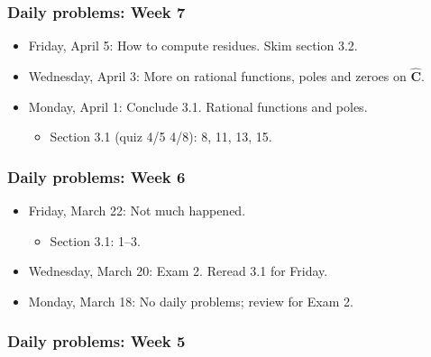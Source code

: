 \subsubsection{Daily problems: Week 7}
\label{dailyproblems:week7}

\begin{itemize}
\item Friday, April 5: How to compute residues. Skim section 3.2.

\item Wednesday, April 3: More on rational functions, poles and zeroes on $\widehat{\mathbf{C}}$.

\item Monday, April 1: Conclude 3.1. Rational functions and poles.

\begin{itemize}
\item Section 3.1 (quiz 4\slash 5 4\slash 8): 8, 11, 13, 15.

\end{itemize}

\end{itemize}

\subsubsection{Daily problems: Week 6}
\label{dailyproblems:week6}

\begin{itemize}
\item Friday, March 22: Not much happened.

\begin{itemize}
\item Section 3.1: 1--3.

\end{itemize}

\item Wednesday, March 20: Exam 2. Reread 3.1 for Friday.

\item Monday, March 18: No daily problems; review for Exam 2.

\end{itemize}

\subsubsection{Daily problems: Week 5}
\label{dailyproblems:week5}

